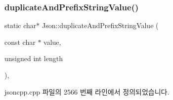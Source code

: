 \subsubsection{\texorpdfstring{duplicate\+And\+Prefix\+String\+Value()}{duplicateAndPrefixStringValue()}}
{\footnotesize\ttfamily static char$\ast$ Json\+::duplicate\+And\+Prefix\+String\+Value (\begin{DoxyParamCaption}\item[{const char $\ast$}]{value,  }\item[{unsigned int}]{length }\end{DoxyParamCaption})\hspace{0.3cm}{\ttfamily [inline]}, {\ttfamily [static]}}



jsoncpp.\+cpp 파일의 2566 번째 라인에서 정의되었습니다.


